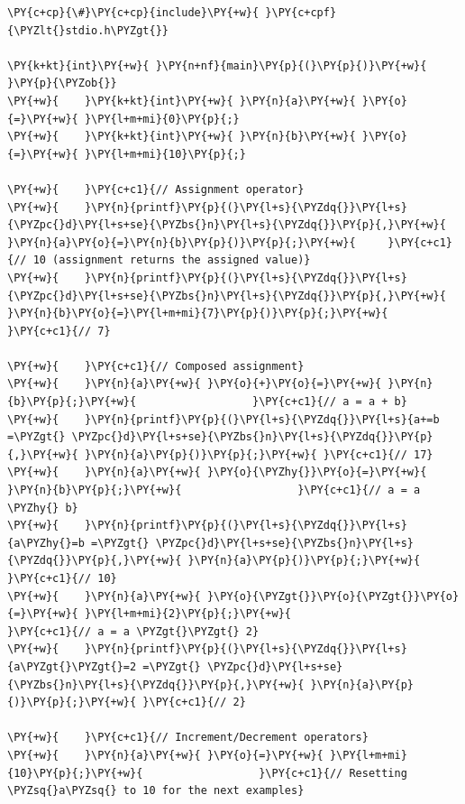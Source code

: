 \begin{Verbatim}[label=\makebox{\url{https://github.com/lucabaldini/cmepda/tree/master/slides/latex/snippets/assignment_and_increment.c}},commandchars=\\\{\}]
\PY{c+cp}{\#}\PY{c+cp}{include}\PY{+w}{ }\PY{c+cpf}{\PYZlt{}stdio.h\PYZgt{}}

\PY{k+kt}{int}\PY{+w}{ }\PY{n+nf}{main}\PY{p}{(}\PY{p}{)}\PY{+w}{ }\PY{p}{\PYZob{}}
\PY{+w}{    }\PY{k+kt}{int}\PY{+w}{ }\PY{n}{a}\PY{+w}{ }\PY{o}{=}\PY{+w}{ }\PY{l+m+mi}{0}\PY{p}{;}
\PY{+w}{    }\PY{k+kt}{int}\PY{+w}{ }\PY{n}{b}\PY{+w}{ }\PY{o}{=}\PY{+w}{ }\PY{l+m+mi}{10}\PY{p}{;}

\PY{+w}{    }\PY{c+c1}{// Assignment operator}
\PY{+w}{    }\PY{n}{printf}\PY{p}{(}\PY{l+s}{\PYZdq{}}\PY{l+s}{\PYZpc{}d}\PY{l+s+se}{\PYZbs{}n}\PY{l+s}{\PYZdq{}}\PY{p}{,}\PY{+w}{ }\PY{n}{a}\PY{o}{=}\PY{n}{b}\PY{p}{)}\PY{p}{;}\PY{+w}{     }\PY{c+c1}{// 10 (assignment returns the assigned value)}
\PY{+w}{    }\PY{n}{printf}\PY{p}{(}\PY{l+s}{\PYZdq{}}\PY{l+s}{\PYZpc{}d}\PY{l+s+se}{\PYZbs{}n}\PY{l+s}{\PYZdq{}}\PY{p}{,}\PY{+w}{ }\PY{n}{b}\PY{o}{=}\PY{l+m+mi}{7}\PY{p}{)}\PY{p}{;}\PY{+w}{     }\PY{c+c1}{// 7}

\PY{+w}{    }\PY{c+c1}{// Composed assignment}
\PY{+w}{    }\PY{n}{a}\PY{+w}{ }\PY{o}{+}\PY{o}{=}\PY{+w}{ }\PY{n}{b}\PY{p}{;}\PY{+w}{                  }\PY{c+c1}{// a = a + b}
\PY{+w}{    }\PY{n}{printf}\PY{p}{(}\PY{l+s}{\PYZdq{}}\PY{l+s}{a+=b =\PYZgt{} \PYZpc{}d}\PY{l+s+se}{\PYZbs{}n}\PY{l+s}{\PYZdq{}}\PY{p}{,}\PY{+w}{ }\PY{n}{a}\PY{p}{)}\PY{p}{;}\PY{+w}{ }\PY{c+c1}{// 17}
\PY{+w}{    }\PY{n}{a}\PY{+w}{ }\PY{o}{\PYZhy{}}\PY{o}{=}\PY{+w}{ }\PY{n}{b}\PY{p}{;}\PY{+w}{                  }\PY{c+c1}{// a = a \PYZhy{} b}
\PY{+w}{    }\PY{n}{printf}\PY{p}{(}\PY{l+s}{\PYZdq{}}\PY{l+s}{a\PYZhy{}=b =\PYZgt{} \PYZpc{}d}\PY{l+s+se}{\PYZbs{}n}\PY{l+s}{\PYZdq{}}\PY{p}{,}\PY{+w}{ }\PY{n}{a}\PY{p}{)}\PY{p}{;}\PY{+w}{ }\PY{c+c1}{// 10}
\PY{+w}{    }\PY{n}{a}\PY{+w}{ }\PY{o}{\PYZgt{}}\PY{o}{\PYZgt{}}\PY{o}{=}\PY{+w}{ }\PY{l+m+mi}{2}\PY{p}{;}\PY{+w}{                 }\PY{c+c1}{// a = a \PYZgt{}\PYZgt{} 2}
\PY{+w}{    }\PY{n}{printf}\PY{p}{(}\PY{l+s}{\PYZdq{}}\PY{l+s}{a\PYZgt{}\PYZgt{}=2 =\PYZgt{} \PYZpc{}d}\PY{l+s+se}{\PYZbs{}n}\PY{l+s}{\PYZdq{}}\PY{p}{,}\PY{+w}{ }\PY{n}{a}\PY{p}{)}\PY{p}{;}\PY{+w}{ }\PY{c+c1}{// 2}

\PY{+w}{    }\PY{c+c1}{// Increment/Decrement operators}
\PY{+w}{    }\PY{n}{a}\PY{+w}{ }\PY{o}{=}\PY{+w}{ }\PY{l+m+mi}{10}\PY{p}{;}\PY{+w}{                  }\PY{c+c1}{// Resetting \PYZsq{}a\PYZsq{} to 10 for the next examples}


\end{Verbatim}
